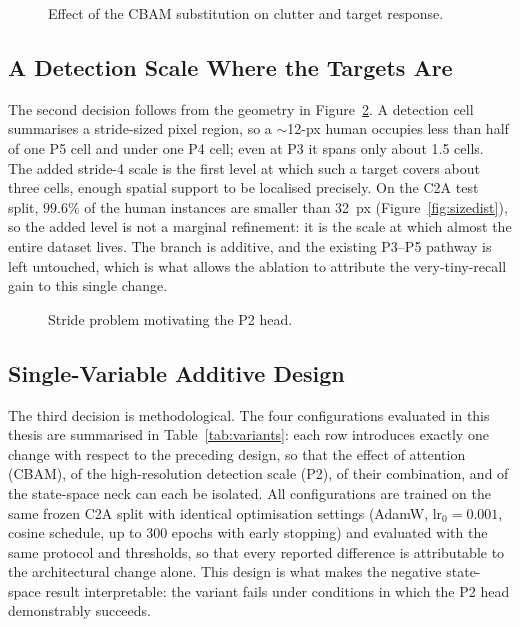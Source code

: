\begin{figure}[H]
  \centering
  \caption{Effect of the CBAM substitution on clutter and target response.}
  \label{fig:cbameffect}
\end{figure}

\subsection{A Detection Scale Where the Targets Are}
\label{sec:p2novel}
The second decision follows from the geometry in Figure~\ref{fig:strideprob}. A
detection cell summarises a stride-sized pixel region, so a $\sim$12-px human
occupies less than half of one P5 cell and under one P4 cell; even at P3 it spans
only about 1.5 cells. The added stride-4 scale is the first level at which such a
target covers about three cells, enough spatial support to be localised
precisely. On the C2A test split, $99.6\%$ of the human instances are smaller
than 32~px (Figure~\ref{fig:sizedist}), so the added level is not a marginal
refinement: it is the scale at which almost the entire dataset lives. The
branch is additive, and the existing P3--P5 pathway is left untouched, which is
what allows the ablation to attribute the very-tiny-recall gain to this single
change.

\begin{figure}[H]
  \centering
  \caption{Stride problem motivating the P2 head.}
  \label{fig:strideprob}
\end{figure}

\subsection{Single-Variable Additive Design}
The third decision is methodological. The four configurations evaluated in this
thesis are summarised in Table~\ref{tab:variants}: each row introduces exactly
one change with respect to the preceding design, so that the effect of attention
(CBAM), of the high-resolution detection scale (P2), of their combination, and
of the state-space neck can each be isolated. All configurations are trained on
the same frozen C2A split with identical optimisation settings (AdamW,
$\text{lr}_0 = 0.001$, cosine schedule, up to 300 epochs with early stopping)
and evaluated with the same protocol and thresholds, so that every reported
difference is attributable to the architectural change alone. This design is
what makes the negative state-space result interpretable: the variant fails
under conditions in which the P2 head demonstrably succeeds.

